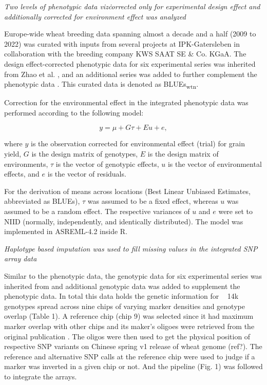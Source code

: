 \documentclass[english, biblatex]{lni}
\begin{document}
\textit{Two levels of phenotypic data viz\. corrected only for experimental design effect and additionally corrected for environment effect was analyzed}

Europe-wide wheat breeding data spanning almost a decade and a half (2009 to 2022) was curated with inputs from several projects at IPK-Gatersleben in collaboration with the breeding company KWS SAAT SE \& Co. KGaA. The design effect-corrected phenotypic data for six experimental series was inherited from Zhao et al. \cite{zhao2021unlocking}, and an additional series was added to further complement the phenotypic data \cite{gogna_gabi_2022}. This curated data is denoted as BLUEs\textsubscript{wtn}.

Correction for the environmental effect in the integrated phenotypic data was performed according to the following model:

\[
y = \mu + G\tau + Eu + e,
\]

where \(y\) is the observation corrected for environmental effect (trial) for grain yield, \(G\) is the design matrix of genotypes, \(E\) is the design matrix of environments, \(\tau\) is the vector of genotypic effects, \(u\) is the vector of environmental effects, and \(e\) is the vector of residuals.

For the derivation of means across locations (Best Linear Unbiased Estimates, abbreviated as BLUEs), \(\tau\) was assumed to be a fixed effect, whereas \(u\) was assumed to be a random effect. The respective variances of \(u\) and \(e\) were set to NIID (normally, independently, and identically distributed). The model was implemented in ASREML-4.2 inside R.

\textit{Haplotype based imputation was used to fill missing values in the integrated SNP array data}

Similar to the phenotypic data, the genotypic data for six experimental series was inherited from \cite{zhao2021unlocking} and additional genotypic data was added to supplement the phenotypic data. In total this data holds the genetic information for ~ 14k genotypes spread across nine chips of varying marker densities and genotype overlap (Table 1). A reference chip (chip 9) was selected since it had maximum marker overlap with other chips and its maker's oligoes were retrieved from the original publication \cite{wang2014characterization}. The oligos were then used to get the physical position of respective SNP variants on Chinese spring v1 release of wheat genome (ref?). The reference and alternative SNP calls at the reference chip were used to judge if a marker was inverted in a given chip or not. And the pipeline (Fig. 1) was followed to integrate the arrays.
\end{document}
